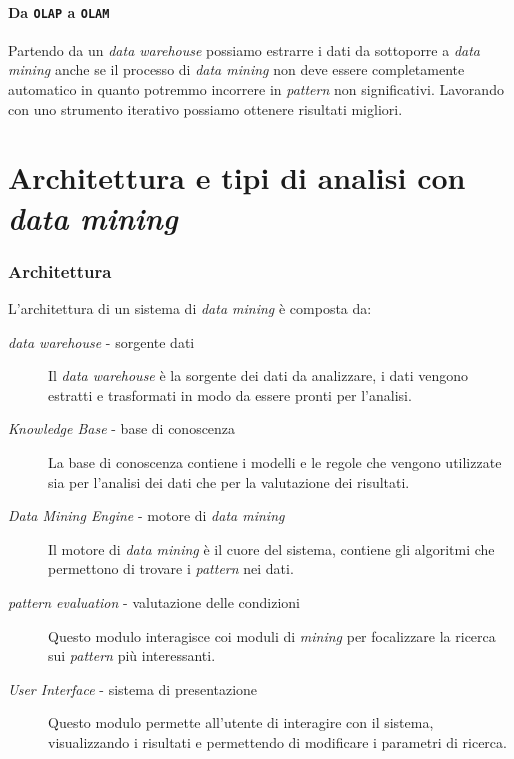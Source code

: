     \paragraph{Da \texttt{OLAP} a \texttt{OLAM}} 
        Partendo da un \textit{data warehouse} possiamo estrarre i dati da sottoporre a \textit{data mining} anche se il processo di \textit{data mining} non deve essere completamente automatico in quanto potremmo incorrere in \textit{pattern} non significativi. Lavorando con uno strumento iterativo possiamo ottenere risultati migliori.
\section{Architettura e tipi di analisi con \textit{data mining}}
    \subsubsection{Architettura}
        L'architettura di un sistema di \textit{data mining} è composta da:
        \begin{description}
            \item[\textit{data warehouse} - sorgente dati] 
                Il \textit{data warehouse} è la sorgente dei dati da analizzare, i dati vengono estratti e trasformati in modo da essere pronti per l'analisi.
            \item[\textit{Knowledge Base} - base di conoscenza] 
                La base di conoscenza contiene i modelli e le regole che vengono utilizzate sia per l'analisi dei dati che per la valutazione dei risultati.
            \item[\textit{Data Mining Engine} - motore di \textit{data mining}] 
                Il motore di \textit{data mining} è il cuore del sistema, contiene gli algoritmi che permettono di trovare i \textit{pattern} nei dati.
            \item[\textit{pattern evaluation} - valutazione delle condizioni] 
                Questo modulo interagisce coi moduli di \textit{mining} per focalizzare la ricerca sui \textit{pattern} più interessanti.
            \item[\textit{User Interface} - sistema di presentazione] 
                Questo modulo permette all'utente di interagire con il sistema, visualizzando i risultati e permettendo di modificare i parametri di ricerca.
        \end{description}
